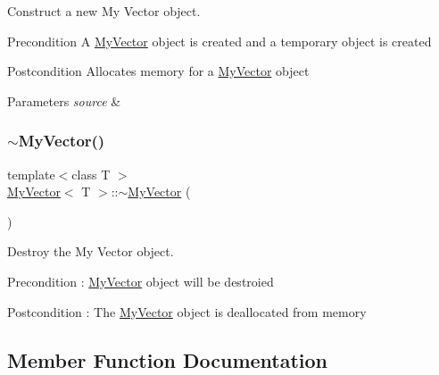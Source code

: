 Construct a new My Vector object. 

\begin{DoxyPrecond}{Precondition}
A \mbox{\hyperlink{class_my_vector}{My\+Vector}} object is created and a temporary object is created 
\end{DoxyPrecond}
\begin{DoxyPostcond}{Postcondition}
Allocates memory for a \mbox{\hyperlink{class_my_vector}{My\+Vector}} object 
\end{DoxyPostcond}

\begin{DoxyParams}{Parameters}
{\em source} & \\
\hline
\end{DoxyParams}
\mbox{\label{class_my_vector_abe59f181259ff63fa583f4bd87a9737e}} 
\subsubsection{\texorpdfstring{$\sim$MyVector()}{~MyVector()}}
{\footnotesize\ttfamily template$<$class T $>$ \\
\mbox{\hyperlink{class_my_vector}{My\+Vector}}$<$ T $>$\+::$\sim$\mbox{\hyperlink{class_my_vector}{My\+Vector}} (\begin{DoxyParamCaption}{ }\end{DoxyParamCaption})}



Destroy the My Vector object. 

\begin{DoxyPrecond}{Precondition}
\+: \mbox{\hyperlink{class_my_vector}{My\+Vector}} object will be destroied 
\end{DoxyPrecond}
\begin{DoxyPostcond}{Postcondition}
\+: The \mbox{\hyperlink{class_my_vector}{My\+Vector}} object is deallocated from memory 
\end{DoxyPostcond}


\subsection{Member Function Documentation}
\mbox{\label{class_my_vector_a5806423f48877c084cc436ecdffa756c}} 
